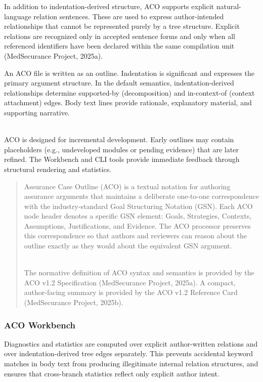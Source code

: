 \documentclass[12pt,twoside,a4paper]{article}
\begin{document}
In addition to indentation-derived structure, ACO supports explicit natural-language relation sentences. These are used to express author-intended relationships that cannot be represented purely by a tree structure. Explicit relations are recognized only in accepted sentence forms and only when all referenced identifiers have been declared within the same compilation unit (MedSecurance Project, 2025a).

An ACO file is written as an outline. Indentation is significant and expresses the primary argument structure. In the default semantics, indentation-derived relationships determine supported-by (decomposition) and in-context-of (context attachment) edges. Body text lines provide rationale, explanatory material, and supporting narrative.\\
\strut \\
ACO is designed for incremental development. Early outlines may contain placeholders (e.g., undeveloped modules or pending evidence) that are later refined. The Workbench and CLI tools provide immediate feedback through structural rendering and statistics.

\begin{quote}
Assurance Case Outline (ACO) is a textual notation for authoring assurance arguments that maintains a deliberate one-to-one correspondence with the industry-standard Goal Structuring Notation (GSN). Each ACO node header denotes a specific GSN element: Goals, Strategies, Contexts, Assumptions, Justifications, and Evidence. The ACO processor preserves this correspondence so that authors and reviewers can reason about the outline exactly as they would about the equivalent GSN argument.\\
\strut \\
The normative definition of ACO syntax and semantics is provided by the ACO v1.2 Specification (MedSecurance Project, 2025a). A compact, author-facing summary is provided by the ACO v1.2 Reference Card (MedSecurance Project, 2025b).
\end{quote}

\hypertarget{aco-workbench}{%
\subsubsection{ACO Workbench}\label{aco-workbench}}

Diagnostics and statistics are computed over explicit author-written relations and over indentation-derived tree edges separately. This prevents accidental keyword matches in body text from producing illegitimate internal relation structures, and ensures that cross-branch statistics reflect only explicit author intent.
\end{document}
